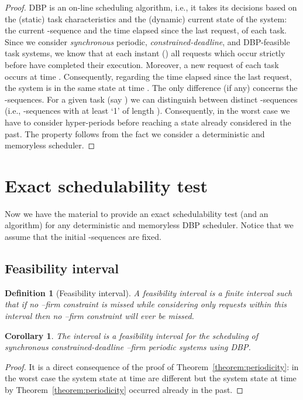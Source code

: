 \documentclass{article}
\newtheorem{Definition}{Definition}
\newtheorem{Corollary}[Theorem]{Corollary}
\begin{document}
\begin{proof}
DBP is an on-line scheduling algorithm, i.e., it takes its decisions based on the (static) task characteristics and the (dynamic) current state of the system: the current -sequence and the time elapsed since the last request, of each task. Since we consider \emph{synchronous} periodic, \emph{constrained-deadline}, and  DBP-feasible task systems, we know that at each instant  () all requests which occur strictly before  have completed their execution. Moreover, a new request of each task occurs at time . Consequently, regarding the time elapsed since the last request, the system is in the same state at time . The only difference (if any) concerns the -sequences. For a given task (say ) we can distinguish between  distinct -sequences (i.e., -sequences with at least  `1' of length  ). Consequently, in the worst case we have to consider  hyper-periods before reaching a state already considered in the past. The property follows from the fact we consider a deterministic and memoryless scheduler.
\end{proof}

\section{Exact schedulability test}\label{sec:exacttest}

Now we have the material to provide an exact schedulability test (and an algorithm) for any deterministic and memoryless DBP scheduler. Notice that we assume that the initial -sequences are fixed.

\subsection{Feasibility interval}

\begin{Definition}[Feasibility interval]
  A \emph{feasibility interval} is a finite interval such that if no --firm constraint is missed  while considering only requests within this interval then no
  --firm constraint will ever be missed.
\end{Definition}

\begin{Corollary}\label{coro:interval}
The interval  is a feasibility interval for the scheduling of synchronous constrained-deadline --firm periodic systems using DBP.
\end{Corollary}

\begin{proof}
It is a direct consequence of the proof of Theorem~\ref{theorem:periodicity}: in the worst case the system state at time  are different but the system state at time  by Theorem~\ref{theorem:periodicity} occurred already in the past.
\end{proof}
\end{document}
